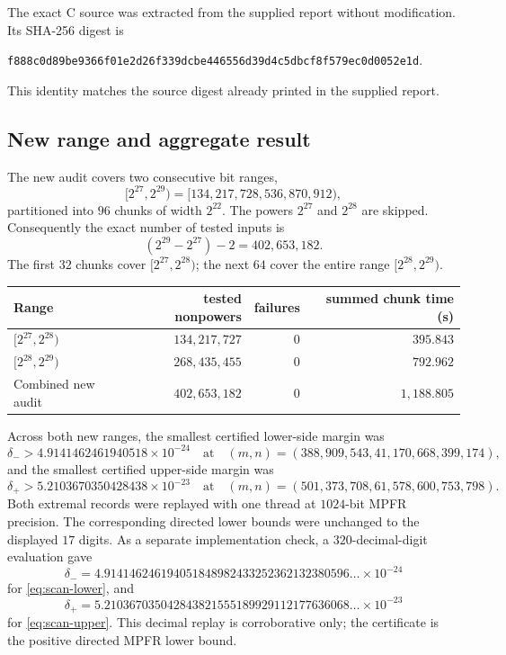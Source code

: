 \documentclass[11pt]{article}
\theoremstyle{definition}
\newcommand{\sha}[1]{\texttt{#1}}
\begin{document}
The exact C source was extracted from the supplied report without modification.  Its SHA-256
digest is
\begin{center}
\sha{f888c0d89be9366f01e2d26f339dcbe446556d39d4c5dbcf8f579ec0d0052e1d}.
\end{center}
This identity matches the source digest already printed in the supplied report.

\subsection{New range and aggregate result}

The new audit covers two consecutive bit ranges,
\[
 [2^{27},2^{29})=[134{,}217{,}728,536{,}870{,}912),
\]
partitioned into $96$ chunks of width $2^{22}$.  The powers $2^{27}$ and $2^{28}$ are skipped.
Consequently the exact number of tested inputs is
\[
 (2^{29}-2^{27})-2=402{,}653{,}182.
\]
The first $32$ chunks cover $[2^{27},2^{28})$; the next $64$ cover the entire range
$[2^{28},2^{29})$.

\begin{center}
\begin{tabular}{@{}lrrr@{}}
\toprule
Range & tested nonpowers & failures & summed chunk time (s) \\
\midrule
$[2^{27},2^{28})$ & $134{,}217{,}727$ & $0$ & $395.843$ \\
$[2^{28},2^{29})$ & $268{,}435{,}455$ & $0$ & $792.962$ \\
\midrule
Combined new audit & $402{,}653{,}182$ & $0$ & $1{,}188.805$ \\
\bottomrule
\end{tabular}
\end{center}

Across both new ranges, the smallest certified lower-side margin was
\begin{equation}\label{eq:scan-lower}
 \delta_->4.9141462461940518\times10^{-24}
 \quad\text{at}\quad
 (m,n)=(388{,}909{,}543,41{,}170{,}668{,}399{,}174),
\end{equation}
and the smallest certified upper-side margin was
\begin{equation}\label{eq:scan-upper}
 \delta_+>5.2103670350428438\times10^{-23}
 \quad\text{at}\quad
 (m,n)=(501{,}373{,}708,61{,}578{,}600{,}753{,}798).
\end{equation}
Both extremal records were replayed with one thread at $1024$-bit MPFR precision.  The
corresponding directed lower bounds were unchanged to the displayed $17$ digits.  As a
separate implementation check, a $320$-decimal-digit evaluation gave
\[
 \delta_-=4.914146246194051848982433252362132380596\ldots\times10^{-24}
\]
for \eqref{eq:scan-lower}, and
\[
 \delta_+=5.210367035042843821555189929112177636068\ldots\times10^{-23}
\]
for \eqref{eq:scan-upper}.  This decimal replay is corroborative only; the certificate is the
positive directed MPFR lower bound.
\end{document}
